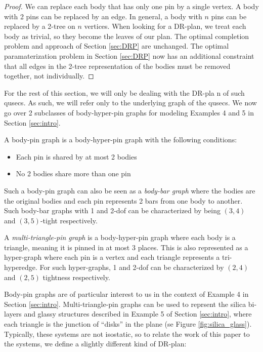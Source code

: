 \begin{proof}
    We can replace each body that has only one pin by a single vertex. A body with 2 pins can be replaced by an edge. In general, a body with $n$ pins can be replaced by a 2-tree on $n$ vertices. When looking for a DR-plan, we treat each body as trivial, so they become the leaves of our plan. The optimal completion problem and approach of Section \ref{sec:DRP} are unchanged. The optimal paramaterization problem in Section \ref{sec:DRP} now has an additional constraint that all edges in the 2-tree representation of the bodies must be removed together, not individually.
\end{proof}

For the rest of this section, we will only be dealing with the DR-pla n of such qusecs. As such, we will refer only to the underlying graph of the qusecs. We now go over 2 subclasses of body-hyper-pin graphs for modeling Examples 4 and 5 in Section \ref{sec:intro}.

\begin{definition}
\label{def:body-pin}
    A body-pin graph is a body-hyper-pin graph with the following conditions:
    \begin{itemize}
        \item Each pin is shared by at most 2 bodies
        \item No 2 bodies share more than one pin
    \end{itemize}
    Such a body-pin graph can also be seen as a \emph{body-bar graph} where the bodies are the original bodies and each pin represents 2 bars from one body to another. Such body-bar graphs with 1 and 2-dof can be characterized by being $(3,4)$ and $(3,5)$-tight respectively.
\end{definition}

\begin{definition}
    A \emph{multi-triangle-pin graph} is a body-hyper-pin graph where each body is a triangle, meaning it is pinned in at most 3 places. This is also represented as a hyper-graph where each pin is a vertex and each triangle represents a tri-hyperedge. For such hyper-graphs, 1 and 2-dof can be characterized by $(2,4)$ and $(2,5)$ tightness respectively.
\end{definition}

Body-pin graphs are of particular interest to us in the context of Example 4 in Section \ref{sec:intro}. Multi-triangle-pin graphs can be used to reprsent the silica bi-layers and glassy structures described in Example 5 of Section \ref{sec:intro}, where each triangle is the junction of ``disks'' in the plane (se Figure \ref{fig:silica_glass}). Typically, these systems are not isostatic, so to relate the work of this paper to the systems, we define a slightly different kind of DR-plan:


